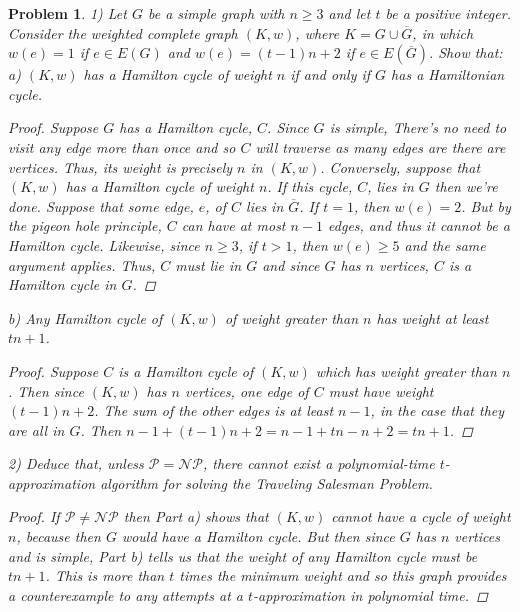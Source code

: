 \documentclass{article}
\newtheorem{problem}{Problem}
\begin{document}
\begin{problem}
1) Let $G$ be a simple graph with $n \geq 3$ and let $t$ be a positive integer. Consider the weighted complete graph $(K, w)$, where $K = G \cup \overline{G}$, in which $w(e) = 1$ if $e \in E(G)$ and $w(e) = (t-1)n + 2$ if $e \in E(\overline{G})$. Show that:\\
a) $(K,w)$ has a Hamilton cycle of weight $n$ if and only if $G$ has a Hamiltonian cycle.
\begin{proof}
Suppose $G$ has a Hamilton cycle, $C$. Since $G$ is simple, There's no need to visit any edge more than once and so $C$ will traverse as many edges are there are vertices. Thus, its weight is precisely $n$ in $(K,w)$. Conversely, suppose that $(K,w)$ has a Hamilton cycle of weight $n$. If this cycle, $C$, lies in $G$ then we're done. Suppose that some edge, $e$, of $C$ lies in $\overline{G}$. If $t = 1$, then $w(e) = 2$. But by the pigeon hole principle, $C$ can have at most $n-1$ edges, and thus it cannot be a Hamilton cycle. Likewise, since $n \geq 3$, if $t > 1$, then $w(e) \geq 5$ and the same argument applies. Thus, $C$ must lie in $G$ and since $G$ has $n$ vertices, $C$ is a Hamilton cycle in $G$.
\end{proof}
b) Any Hamilton cycle of $(K,w)$ of weight greater than $n$ has weight at least $tn+1$.
\begin{proof}
Suppose $C$ is a Hamilton cycle of $(K,w)$ which has weight greater than $n$. Then since $(K,w)$ has $n$ vertices, one edge of $C$ must have weight $(t-1)n + 2$. The sum of the other edges is at least $n-1$, in the case that they are all in $G$. Then $n-1 + (t-1)n + 2 = n-1 + tn-n +2 = tn+1$.
\end{proof}
2) Deduce that, unless $\mathcal{P} = \mathcal{NP}$, there cannot exist a polynomial-time $t$-approximation algorithm for solving the Traveling Salesman Problem.
\begin{proof}
If $\mathcal{P} \neq \mathcal{NP}$ then Part a) shows that $(K,w)$ cannot have a cycle of weight $n$, because then $G$ would have a Hamilton cycle. But then since $G$ has $n$ vertices and is simple, Part b) tells us that the weight of any Hamilton cycle must be $tn+1$. This is more than $t$ times the minimum weight and so this graph provides a counterexample to any attempts at a $t$-approximation in polynomial time.
\end{proof}
\end{problem}
\end{document}
